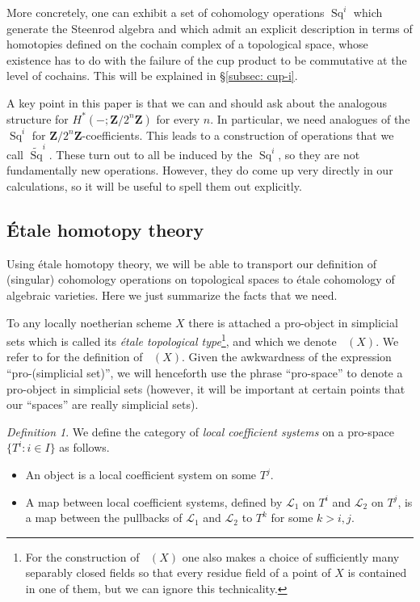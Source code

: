 \documentclass[10pt, reqno]{amsart}
\numberwithin{equation}{subsection}
\newcommand{\wt}[1]{\widetilde{#1}}
\newcommand{\Z}{\mathbf{Z}}
\newcommand{\Cal}[1]{\mathcal{#1}}
\newcommand{\co}{\colon}
\DeclareMathOperator{\Sq}{Sq}
\DeclareMathOperator{\Et}{\acute{E}t}
\theoremstyle{remark}
\newtheorem{defn}[thm]{Definition}
\begin{document}
More concretely, one can exhibit a set of cohomology operations $\Sq^i$ which generate the Steenrod algebra and which admit an explicit description in terms of homotopies defined on the cochain complex of a topological space, whose existence has to do with the failure of the cup product to be commutative at the level of cochains. This will be explained in \S \ref{subsec: cup-i}.

A key point in this paper is that we can and should ask about the analogous structure for $H^*(-; \Z/2^n\Z)$ for every $n$. In particular, we need analogues of the $\Sq^i$ for $\Z/2^n \Z$-coefficients. This leads to a construction of operations that we call $\wt{\Sq}^i$. These turn out to all be induced by the $\Sq^i$, so they are not fundamentally new operations. However, they do come up very directly in our calculations, so it will be useful to spell them out explicitly. 




\subsection{\'{E}tale homotopy theory}\label{subsec: etale homotopy}


Using \'{e}tale homotopy theory, we will be able to transport our definition of (singular) cohomology operations on topological spaces to \'{e}tale cohomology of algebraic varieties. Here we just summarize the facts that we need.

To any locally noetherian scheme $X$ there is attached a pro-object in simplicial sets which is called its \emph{\'{e}tale topological type}\footnote{For the construction of $\Et(X)$ one also makes a choice of sufficiently many separably closed fields so that every residue field of a point of $X$ is contained in one of them, but we can ignore this technicality.}, and which we denote $\Et(X)$.  We refer to \cite[Definition 4.4]{Fr82} for the definition of $\Et(X)$. Given the awkwardness of the expression ``pro-(simplicial set)'', we will henceforth use the phrase ``pro-space'' to denote a pro-object in simplicial sets (however, it will be important at certain points that our ``spaces'' are really simplicial sets). 


\begin{defn}We define the category of \emph{local coefficient systems} on a pro-space $\{T^i \co i \in I\}$ as follows. 
\begin{itemize}
\item An object is a local coefficient system on some $T^j$.
\item A map between local coefficient systems, defined by $\Cal{L}_1$ on $T^i$ and $\Cal{L}_2$ on $T^j$, is a map between the pullbacks of $\Cal{L}_1$ and $\Cal{L}_2$ to $T^k$ for some $k>i,j$. 
\end{itemize}
\end{defn}
\end{document}
